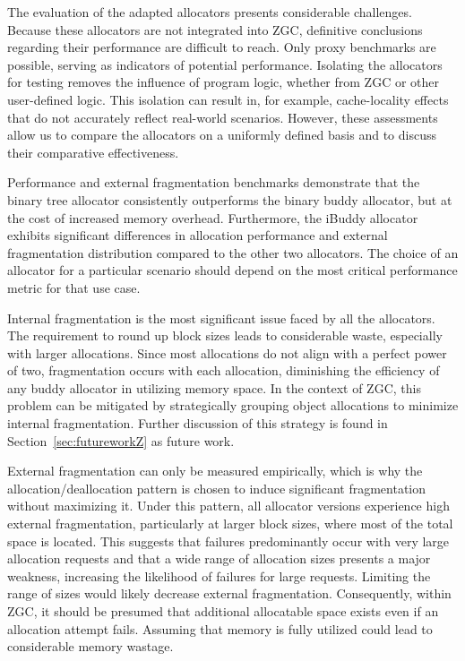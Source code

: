 
The evaluation of the adapted allocators presents considerable challenges. Because these allocators are not integrated into ZGC, definitive conclusions regarding their performance are difficult to reach. Only proxy benchmarks are possible, serving as indicators of potential performance. Isolating the allocators for testing removes the influence of program logic, whether from ZGC or other user-defined logic. This isolation can result in, for example, cache-locality effects that do not accurately reflect real-world scenarios. However, these assessments allow us to compare the allocators on a uniformly defined basis and to discuss their comparative effectiveness.

Performance and external fragmentation benchmarks demonstrate that the binary tree allocator consistently outperforms the binary buddy allocator, but at the cost of increased memory overhead. Furthermore, the iBuddy allocator exhibits significant differences in allocation performance and external fragmentation distribution compared to the other two allocators. The choice of an allocator for a particular scenario should depend on the most critical performance metric for that use case.

Internal fragmentation is the most significant issue faced by all the allocators. The requirement to round up block sizes leads to considerable waste, especially with larger allocations. Since most allocations do not align with a perfect power of two, fragmentation occurs with each allocation, diminishing the efficiency of any buddy allocator in utilizing memory space. In the context of ZGC, this problem can be mitigated by strategically grouping object allocations to minimize internal fragmentation. Further discussion of this strategy is found in Section~\ref{sec:futureworkZ} as future work.

External fragmentation can only be measured empirically, which is why the allocation/deallocation pattern is chosen to induce significant fragmentation without maximizing it. Under this pattern, all allocator versions experience high external fragmentation, particularly at larger block sizes, where most of the total space is located. This suggests that failures predominantly occur with very large allocation requests and that a wide range of allocation sizes presents a major weakness, increasing the likelihood of failures for large requests. Limiting the range of sizes would likely decrease external fragmentation. Consequently, within ZGC, it should be presumed that additional allocatable space exists even if an allocation attempt fails. Assuming that memory is fully utilized could lead to considerable memory wastage.

